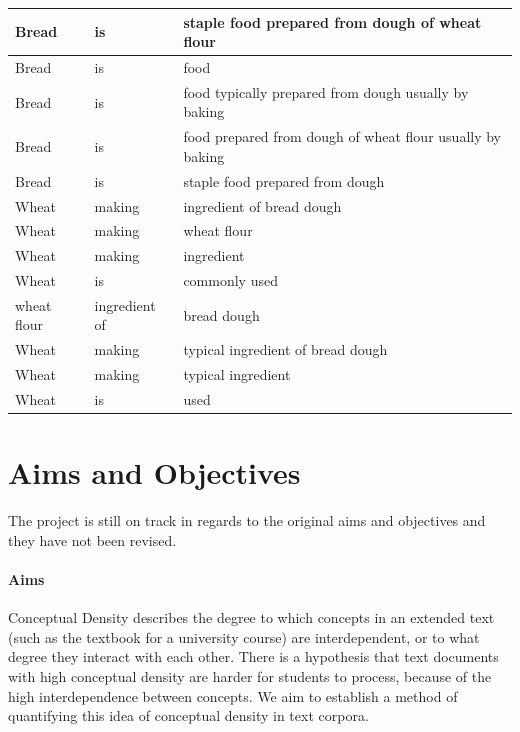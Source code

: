 \documentclass[12pt]{article}
\theoremstyle{grammarstyle}
\begin{document}
\begin{longtable}{|l|l|p{8cm}|}
    \hline
    Bread    &	is	&    staple food prepared from dough of wheat flour \\
    \hline
    Bread    &	is	&    food \\
    \hline
    Bread    &	is	&    food typically prepared from dough usually by baking \\
    \hline
    Bread    &	is	&    food prepared from dough of wheat flour usually by baking \\
    \hline
    Bread    &	is	&    staple food prepared from dough \\
    \hline
    Wheat    &	making	&    ingredient of bread dough \\
    \hline
    Wheat    &	making	&    wheat flour \\
    \hline
    Wheat    &	making	&    ingredient \\
    \hline
    Wheat    &	is	&    commonly used \\
    \hline
    wheat flour    &	ingredient of	&    bread dough \\
    \hline
    Wheat    &	making	&    typical ingredient of bread dough \\
    \hline
    Wheat    &	making	&    typical ingredient \\
    \hline
    Wheat    &	is	&    used \\
    \hline
\end{longtable}

\section{Aims and Objectives}
The project is still on track in regards to the original aims and objectives and they have not been revised.

\paragraph{Aims}
Conceptual Density describes the degree to which concepts in an extended text (such as the textbook for a university course) are interdependent, or to what degree they interact with each other. There is a hypothesis that text documents with high conceptual density are harder for students to process, because of the high interdependence between concepts. We aim to establish a method of quantifying this idea of conceptual density in text corpora.
\end{document}
